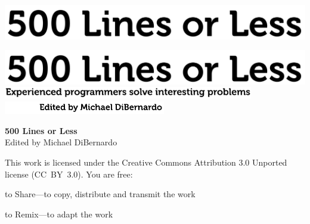 \newpage

\thispagestyle{empty}
\vspace*{8.5cm}
\hspace{-2.3cm}
\includegraphics[width=445pt]{frontmatter-images/title.pdf}

\newpage

\thispagestyle{empty}
\mbox{}    %

\newpage

\thispagestyle{empty}
\vspace*{8.5cm}
\hspace{-2.3cm}
\includegraphics[width=445pt]{frontmatter-images/title.pdf}
\\
\vspace{0.5cm}   %
\hspace{-1.8cm}   %
\includegraphics[width=310pt]{frontmatter-images/subtitle.pdf}
\vfill
\hfill
\includegraphics[width=200pt]{frontmatter-images/eds.pdf}

\newpage

\thispagestyle{empty}

\small
\noindent \textbf{500 Lines or Less} \\
Edited by Michael DiBernardo

\vspace{0.15cm}

\noindent
This work is licensed under the Creative Commons Attribution 3.0
Unported license (CC~BY~3.0).  You are free:

\begin{aosaitemize}
  \item to Share---to copy, distribute and transmit the work
  \item to Remix---to adapt the work
\end{aosaitemize}


